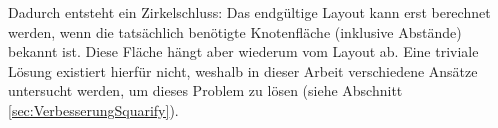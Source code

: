 Dadurch entsteht ein Zirkelschluss: Das endgültige Layout kann erst berechnet werden, wenn die tatsächlich benötigte Knotenfläche (inklusive Abstände) bekannt ist. Diese Fläche hängt aber wiederum vom Layout ab. Eine triviale Lösung existiert hierfür nicht, weshalb in dieser Arbeit verschiedene Ansätze untersucht werden, um dieses Problem zu lösen (siehe Abschnitt \ref{sec:VerbesserungSquarify}).




